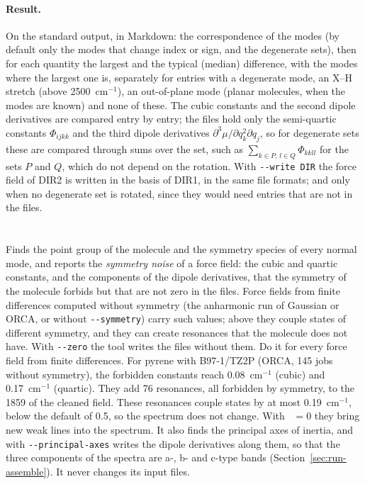 \paragraph{Result.} On the standard output, in Markdown: the
correspondence of the modes (by default only the modes that change index
or sign, and the degenerate sets), then for each quantity the largest and
the typical (median) difference, with the modes where the largest one
is, separately for entries with a degenerate mode, an X--H stretch
(above 2500~cm$^{-1}$), an out-of-plane mode (planar molecules, when the
modes are known) and none of these. The cubic constants and the second
dipole derivatives are compared entry by entry; the files hold only the
semi-quartic constants $\Phi_{ijkk}$ and the third dipole derivatives
$\partial^3\mu/\partial q_k^2\partial q_j$, so for degenerate sets these
are compared through sums over the set, such as
$\sum_{k\in P,\,l\in Q}\Phi_{kkll}$ for the sets $P$ and $Q$, which do
not depend on the rotation. With \texttt{-{}-write DIR} the force field
of DIR2 is written in the basis of DIR1, in the same file formats;
 and  only when no degenerate set is
rotated, since they would need entries that are not in the files.

\section{}\label{sec:run-symm}

Finds the point group of the molecule and the symmetry species of every
normal mode, and reports the \emph{symmetry noise} of a force field: the
cubic and quartic constants, and the components of the dipole
derivatives, that the symmetry of the molecule forbids but that are not
zero in the files. Force fields from finite differences computed
without symmetry (the anharmonic run of Gaussian or ORCA, or
 without \texttt{-{}-symmetry}) carry such values; above
 they couple states of different symmetry, and they
can create resonances that the molecule does not have. With
\texttt{-{}-zero} the tool writes the files without them. Do it for every
force field from finite differences. For pyrene with B97-1/TZ2P (ORCA,
145 jobs without symmetry), the forbidden constants reach
0.08~cm$^{-1}$ (cubic) and 0.17~cm$^{-1}$ (quartic). They add 76
resonances, all forbidden by symmetry, to the 1859 of the cleaned field.
These resonances couple states by at most 0.19~cm$^{-1}$, below the
default  of 0.5, so the spectrum does not change. With
~$= 0$ they bring new weak lines into the spectrum. It also finds
the principal axes of inertia, and with \texttt{-{}-principal-axes} writes
the dipole derivatives along them, so that the three components of the
spectra are a-, b- and c-type bands (Section~\ref{sec:run-assemble}). It never
changes its input files.

